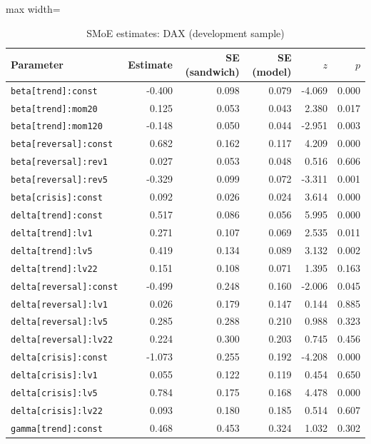\begin{table}[!htbp]\centering\scriptsize
\caption{SMoE estimates: DAX (development sample)}\label{tab:params_dax}
\begin{adjustbox}{max width=\textwidth}
\begin{tabular}{lrrrrr}
\toprule
Parameter & Estimate & SE (sandwich) & SE (model) & $z$ & $p$\\
\midrule
\texttt{beta[trend]:const} & -0.400 & 0.098 & 0.079 & -4.069 & 0.000\\
\texttt{beta[trend]:mom20} & 0.125 & 0.053 & 0.043 & 2.380 & 0.017\\
\texttt{beta[trend]:mom120} & -0.148 & 0.050 & 0.044 & -2.951 & 0.003\\
\texttt{beta[reversal]:const} & 0.682 & 0.162 & 0.117 & 4.209 & 0.000\\
\texttt{beta[reversal]:rev1} & 0.027 & 0.053 & 0.048 & 0.516 & 0.606\\
\texttt{beta[reversal]:rev5} & -0.329 & 0.099 & 0.072 & -3.311 & 0.001\\
\texttt{beta[crisis]:const} & 0.092 & 0.026 & 0.024 & 3.614 & 0.000\\
\texttt{delta[trend]:const} & 0.517 & 0.086 & 0.056 & 5.995 & 0.000\\
\texttt{delta[trend]:lv1} & 0.271 & 0.107 & 0.069 & 2.535 & 0.011\\
\texttt{delta[trend]:lv5} & 0.419 & 0.134 & 0.089 & 3.132 & 0.002\\
\texttt{delta[trend]:lv22} & 0.151 & 0.108 & 0.071 & 1.395 & 0.163\\
\texttt{delta[reversal]:const} & -0.499 & 0.248 & 0.160 & -2.006 & 0.045\\
\texttt{delta[reversal]:lv1} & 0.026 & 0.179 & 0.147 & 0.144 & 0.885\\
\texttt{delta[reversal]:lv5} & 0.285 & 0.288 & 0.210 & 0.988 & 0.323\\
\texttt{delta[reversal]:lv22} & 0.224 & 0.300 & 0.203 & 0.745 & 0.456\\
\texttt{delta[crisis]:const} & -1.073 & 0.255 & 0.192 & -4.208 & 0.000\\
\texttt{delta[crisis]:lv1} & 0.055 & 0.122 & 0.119 & 0.454 & 0.650\\
\texttt{delta[crisis]:lv5} & 0.784 & 0.175 & 0.168 & 4.478 & 0.000\\
\texttt{delta[crisis]:lv22} & 0.093 & 0.180 & 0.185 & 0.514 & 0.607\\
\texttt{gamma[trend]:const} & 0.468 & 0.453 & 0.324 & 1.032 & 0.302\\

\end{tabular}
\end{adjustbox}
\end{table}
